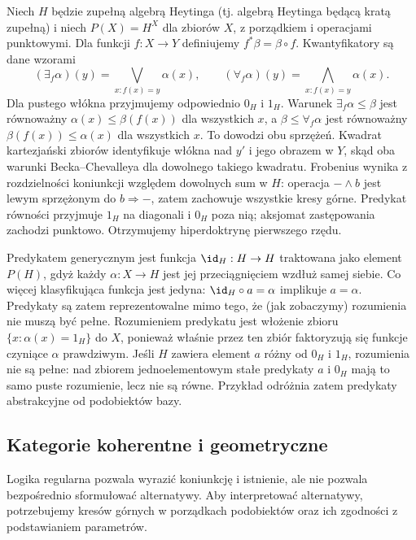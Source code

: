 \begin{przyklad}\label{cat:ex:cl-heyting-valued-doctrine}
Niech $H$ będzie zupełną algebrą Heytinga (tj. algebrą Heytinga będącą kratą zupełną) i niech $P(X)=H^X$ dla zbiorów $X$, z porządkiem i operacjami punktowymi. Dla funkcji $f:X\to Y$ definiujemy $f^*\beta=\beta\circ f$. Kwantyfikatory są dane wzorami
\[
 (\exists_f\alpha)(y)=\bigvee_{x:f(x)=y}\alpha(x),
 \qquad
 (\forall_f\alpha)(y)=\bigwedge_{x:f(x)=y}\alpha(x).
\]
Dla pustego włókna przyjmujemy odpowiednio $0_H$ i $1_H$. Warunek $\exists_f\alpha\leq\beta$ jest równoważny $\alpha(x)\leq\beta(f(x))$ dla wszystkich $x$, a $\beta\leq\forall_f\alpha$ jest równoważny $\beta(f(x))\leq\alpha(x)$ dla wszystkich $x$. To dowodzi obu sprzężeń. Kwadrat kartezjański zbiorów identyfikuje włókna nad $y'$ i jego obrazem w $Y$, skąd oba warunki Becka--Chevalleya dla dowolnego takiego kwadratu. Frobenius wynika z rozdzielności koniunkcji względem dowolnych sum w $H$: operacja $-\wedge b$ jest lewym sprzężonym do $b\Rightarrow-$, zatem zachowuje wszystkie kresy górne. Predykat równości przyjmuje $1_H$ na diagonali i $0_H$ poza nią; aksjomat zastępowania zachodzi punktowo. Otrzymujemy hiperdoktrynę pierwszego rzędu.

Predykatem generycznym jest funkcja $\id_H:H\to H$ traktowana jako element $P(H)$, gdyż każdy $\alpha:X\to H$ jest jej przeciągnięciem wzdłuż samej siebie. Co więcej klasyfikująca funkcja jest jedyna: $\id_H\circ a=\alpha$ implikuje $a=\alpha$. Predykaty są zatem reprezentowalne mimo tego, że (jak zobaczymy) rozumienia nie muszą być pełne. Rozumieniem predykatu jest włożenie zbioru $\{x:\alpha(x)=1_H\}$ do $X$, ponieważ właśnie przez ten zbiór faktoryzują się funkcje czyniące $\alpha$ prawdziwym. Jeśli $H$ zawiera element $a$ różny od $0_H$ i $1_H$, rozumienia nie są pełne: nad zbiorem jednoelementowym stałe predykaty $a$ i $0_H$ mają to samo puste rozumienie, lecz nie są równe. Przykład odróżnia zatem predykaty abstrakcyjne od podobiektów bazy.
\end{przyklad}

\subsection{Kategorie koherentne i geometryczne}

Logika regularna pozwala wyrazić koniunkcję i istnienie, ale nie pozwala bezpośrednio sformułować alternatywy. Aby interpretować alternatywy, potrzebujemy kresów górnych w porządkach podobiektów oraz ich zgodności z podstawianiem parametrów.


